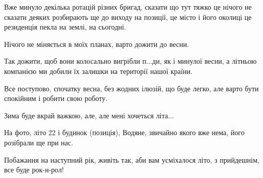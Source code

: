 Вже минуло декілька ротацій різних бригад, сказати що тут тяжко це нічого не
сказати деяких розбирають ще до виходу на позиції, це місто і його околиці
це резиденція пекла на землі, на сьогодні.

Нічого не міняється в моїх планах, варто дожити до весни.

Так дожити, щоб вони колосально вигрібли п...ди, як і минулої весни, а літньою
компанією ми  добили їх залишки на території нашої країни.

Все поступово, спочатку весна, без жодних ілюзій, що буде легко, але варто
бути спокійним і робити свою роботу.

Зима буде вкрай важкою, але, але мені хочеться літа...

На фото, літо 22 і будинок (позиція), Водяне, звичайно якого вже нема, його
розібрали ще при нас. 

Побажання на наступний рік, живіть так, аби вам усміхалося літо, з прийдешнім,
все буде рок-н-рол!
